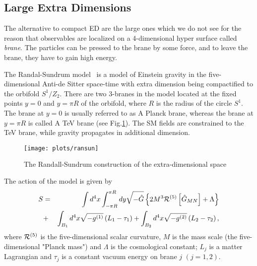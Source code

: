 \documentclass{cernyrep}
\begin{document}
\subsection{Large Extra Dimensions}

The alternative to compact ED are the large ones which we do not see for the reason that observables are localized on a 4-dimensional hyper surface called {\it brane}. The particles can be 
pressed to the brane by some force, and to leave the brane, they have to gain  high energy.

The Randal-Sundrum model~\cite{RS} is a model of Einstein gravity in the
five-dimensional Anti-de Sitter space-time with extra dimension
being compactified to the orbifold $S^{1}/Z_{2}$. There are two
3-branes in the model located at the fixed points $y=0$ and $y=\pi
R$ of the orbifold, where $R$ is the radius of the circle $S^{1}$.
The brane at $y=0$ is usually referred to as A Planck brane,
whereas the brane at $y=\pi R$ is called A TeV brane (see
Fig.\ref{ransun}). The SM fields are constrained to the TeV brane,
while gravity propagates in additional dimension.
\begin{figure}[htb]
\begin{center}
\leavevmode
\texttt{[image: plots/ransun]}
\end{center}
\caption{The Randall-Sundrum construction of the extra-dimensional
space} \label{ransun}
\end{figure}

The action of the model is given by
\begin{eqnarray}
  S & = &  \int d^{4}x \int_{-\pi R}^{\pi R} dy \sqrt{-\hat{G}}
\left\{ 2 M^{3} {\cal R}^{(5)} \left[\hat{G}_{MN}\right] + \Lambda
\right\} \nonumber \\
   & +&  \int_{B_{1}} d^{4}x \sqrt{-g^{(1)}} \left( L_{1} - \tau_{1}
\right) + \int_{B_{2}} d^{4}x \sqrt{-g^{(2)}} \left( L_{2} -
\tau_{2} \right),
           \label{RS:L}
\end{eqnarray}
where ${\cal R}^{(5)}$ is the five-dimensional scalar curvature,
$M$ is the mass scale (the five-dimensional "Planck mass") and
$\Lambda$ is the cosmological constant; $L_{j}$ is a matter
Lagrangian and $\tau_{j}$ is a constant vacuum energy on brane $j$
$(j=1,2)$.
\end{document}
